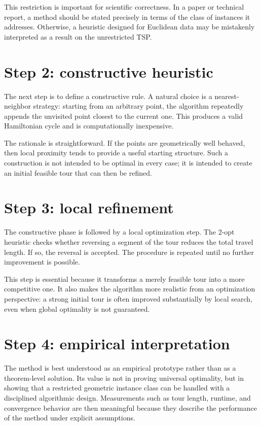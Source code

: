 \documentclass[11pt]{article}
\begin{document}
This restriction is important for scientific correctness. In a paper or technical report, a method should be stated precisely in terms of the class of instances it addresses. Otherwise, a heuristic designed for Euclidean data may be mistakenly interpreted as a result on the unrestricted TSP.

\section{Step 2: constructive heuristic}

The next step is to define a constructive rule. A natural choice is a nearest-neighbor strategy: starting from an arbitrary point, the algorithm repeatedly appends the unvisited point closest to the current one. This produces a valid Hamiltonian cycle and is computationally inexpensive.

The rationale is straightforward. If the points are geometrically well behaved, then local proximity tends to provide a useful starting structure. Such a construction is not intended to be optimal in every case; it is intended to create an initial feasible tour that can then be refined.

\section{Step 3: local refinement}

The constructive phase is followed by a local optimization step. The 2-opt heuristic checks whether reversing a segment of the tour reduces the total travel length. If so, the reversal is accepted. The procedure is repeated until no further improvement is possible.

This step is essential because it transforms a merely feasible tour into a more competitive one. It also makes the algorithm more realistic from an optimization perspective: a strong initial tour is often improved substantially by local search, even when global optimality is not guaranteed.

\section{Step 4: empirical interpretation}

The method is best understood as an empirical prototype rather than as a theorem-level solution. Its value is not in proving universal optimality, but in showing that a restricted geometric instance class can be handled with a disciplined algorithmic design. Measurements such as tour length, runtime, and convergence behavior are then meaningful because they describe the performance of the method under explicit assumptions.
\end{document}

